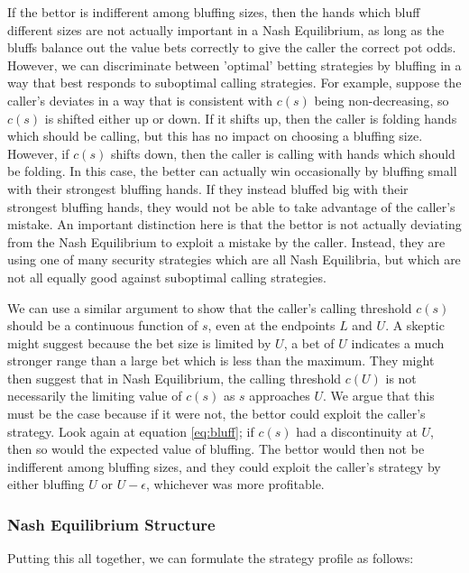 \documentclass[a4paper,12pt]{article}
\theoremstyle{plain}
\theoremstyle{definition}
\begin{document}
If the bettor is indifferent among bluffing sizes, then the hands which bluff different sizes are not actually important in a Nash Equilibrium, as long as the bluffs balance out the value bets correctly to give the caller the correct pot odds. However, we can discriminate between 'optimal' betting strategies by bluffing in a way that best responds to suboptimal calling strategies. For example, suppose the caller's deviates in a way that is consistent with $c(s)$ being non-decreasing, so $c(s)$ is shifted either up or down. If it shifts up, then the caller is folding hands which should be calling, but this has no impact on choosing a bluffing size. However, if $c(s)$ shifts down, then the caller is calling with hands which should be folding. In this case, the better can actually win occasionally by bluffing small with their strongest bluffing hands. If they instead bluffed big with their strongest bluffing hands, they would not be able to take advantage of the caller's mistake. An important distinction here is that the bettor is not actually deviating from the Nash Equilibrium to exploit a mistake by the caller. Instead, they are using one of many security strategies which are all Nash Equilibria, but which are not all equally good against suboptimal calling strategies. 

We can use a similar argument to show that the caller's calling threshold $c(s)$ should be a continuous function of $s$, even at the endpoints $L$ and $U$. A skeptic might suggest because the bet size is limited by $U$, a bet of $U$ indicates a much stronger range than a large bet which is less than the maximum. They might then suggest that in Nash Equilibrium, the calling threshold $c(U)$ is not necessarily the limiting value of $c(s)$ as $s$ approaches $U$. We argue that this must be the case because if it were not, the bettor could exploit the caller's strategy. Look again at equation \ref{eq:bluff}; if $c(s)$ had a discontinuity at $U$, then so would the expected value of bluffing. The bettor would then not be indifferent among bluffing sizes, and they could exploit the caller's strategy by either bluffing $U$ or $U-\epsilon$, whichever was more profitable.

\subsubsection{Nash Equilibrium Structure}
\label{subsec:nash_equilibrium_structure}

Putting this all together, we can formulate the strategy profile as follows:
\end{document}
